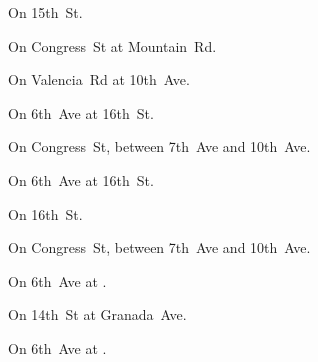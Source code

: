 
\begin{LocationList}

On 15th~St.

On Congress~St at  Mountain~Rd.

On Valencia~Rd at 10th~Ave.

On 6th~Ave at 16th~St.

\Location{\GarageHQ \Garage}
On Congress~St, between 7th~Ave and 10th~Ave.

\Location{\GasStation \Gas}
On 6th~Ave at 16th~St.

On 16th~St.

\Location{\RecruitmentAgency \Recruitment}
On Congress~St, between 7th~Ave and 10th~Ave.

On 6th~Ave at  .

On 14th~St at Granada~Ave.

On 6th~Ave at  .

\end{LocationList}
